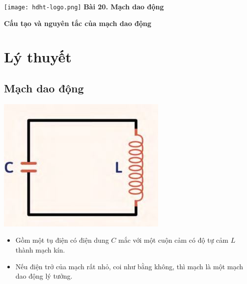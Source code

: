 \newcommand{\chapter}[2][]{
	\newcommand{\chapname}{#2}
	\begin{flushleft}
		\begin{minipage}[t]{\linewidth}
			\texttt{[image: hdht-logo.png]}
			\hspace{0pt}	
			\sffamily\bfseries\large Bài  20. Mạch dao động
			\begin{flushleft}
				\huge\bfseries #1
			\end{flushleft}
		\end{minipage}
	\end{flushleft}
	\vspace{1cm}
	\normalfont\normalsize
}
\chapter[Cấu tạo và nguyên tắc của mạch dao động]{Cấu tạo và nguyên tắc của mạch dao động}
\section{Lý thuyết}
	\subsection {Mạch dao động}
\begin{center}
	\includegraphics[scale=0.5]{../figs/4-1-1.JPG}
\end{center}
\begin{itemize}
	\item Gồm một tụ điện có điện dung $C$ mắc với một cuộn cảm có độ tự cảm $L$ thành mạch kín.
	\item Nếu điện trở của mạch rất nhỏ, coi như bằng không, thì mạch là một mạch dao động lý tưởng.
\end{itemize}

